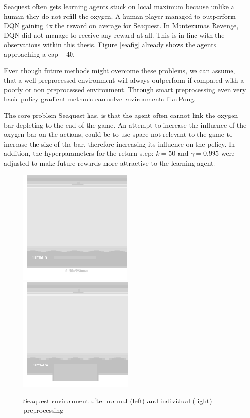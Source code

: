 Seaquest often gets learning agents stuck on local maximum because unlike a human they do not refill the oxygen.
A human player managed to outperform DQN \citep{nature} gaining 4x the reward on average for Seaquest. In Montezumas Revenge, DQN did not manage to receive any reward at all.
This is in line with the observations within this thesis. Figure \ref{seafig} already shows the agents approaching a cap ~ 40.

Even though future methods might overcome these problems, we can assume, that a well preprocessed environment will always outperform if compared with a poorly or non preprocessed environment.
Through smart preprocessing even very basic policy gradient methods can solve environments like Pong.  \citep{karpathy}

The core problem Seaquest has, is that the agent often cannot link the oxygen bar depleting to the end of the game. 
An attempt to increase the influence of the oxygen bar on the actions, could be to use space not relevant to the game to increase the size of the bar, therefore increasing its influence on the policy.
In addition, the hyperparameters for the return step: $k=50$ and $\gamma =0.995$ were adjusted to make future rewards more attractive to the learning agent.

\begin{figure}[h]
\includegraphics[scale=1]{bilder/seaquestgamenopre.png}
\includegraphics[scale=1]{bilder/seaquestgameprepro.png}
\caption{Seaquest environment after normal (left) and individual (right) preprocessing}
\end{figure}

